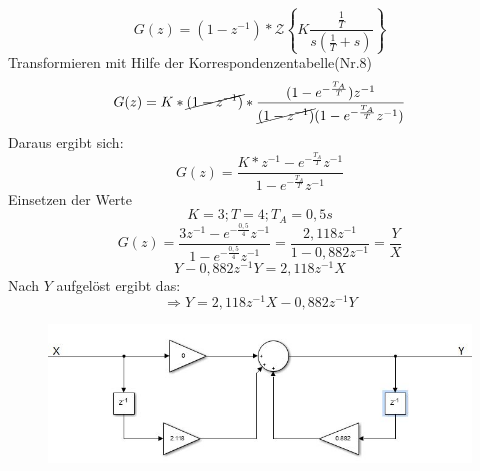 \documentclass[12pt,a4paper]{report}
\begin{document}
\begin{equation}
G(z) = (1-z^{-1})*\mathcal{Z}\left\{K\frac{\frac{1}{T}}{s(\frac{1}{T}+s)}\right\}
\end{equation}
Transformieren mit Hilfe der Korrespondenzentabelle(Nr.8)
\begin{equation}
G(z) = K*\cancel{(1-z^{-1})}*
\frac{(1-e^{-\frac{T_A}{T}})z^{-1}}
{\cancel{(1-z^{-1})}(1-e^{-\frac{T_A}{T}}z^{-1})}
\end{equation}
Daraus ergibt sich: 
\begin{equation}
G(z) = \frac{K*z^{-1}-e^{-\frac{T_A}{T}}z^{-1}}
{1-e^{-\frac{T_A}{T}}z^{-1}} 
\end{equation}
Einsetzen der Werte
\begin{equation}
K = 3; T = 4; T_A = 0,5s
\end{equation}
\begin{equation}
G(z) = \frac{3z^{-1}-e^{-\frac{0,5}{4}}z^{-1}}
{1-e^{-\frac{0,5}{4}}z^{-1}} = \frac{2,118z^{-1}}{1-0,882z^{-1}} = \frac{Y}{X}
\end{equation}
\begin{equation}
 Y- 0,882z^{-1}Y = 2,118z^{-1}X
\end{equation}
Nach $ Y $ aufgelöst ergibt das:
\begin{equation}
\Rightarrow Y = 2,118z^{-1}X - 0,882z^{-1}Y
\end{equation}
\begin{figure}
\centering
\includegraphics[width=0.7\linewidth]{marius/PT1}
\caption{}
\label{fig:PT1}

\end{figure}

	
\end{document}
